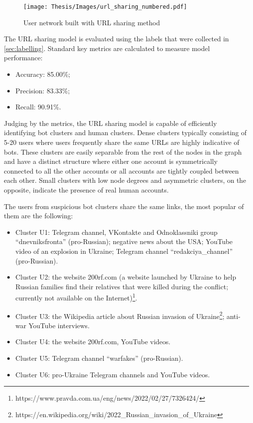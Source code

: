 \begin{figure}
	\centering
	\texttt{[image: Thesis/Images/url\_sharing\_numbered.pdf]}
	\caption{User network built with URL sharing  method}
	\label{fig:url-sharing}
\end{figure}

The URL sharing model is evaluated using the labels that were collected in \ref{sec:labelling}. Standard key metrics are calculated to measure model performance:
\begin{itemize}
    \item Accuracy: 85.00\%;
    \item Precision: 83.33\%;
    \item Recall: 90.91\%.
\end{itemize}

Judging by the metrics, the URL sharing model is capable of efficiently identifying bot clusters and human clusters. Dense clusters typically consisting of 5-20 users where users frequently share the same URLs are highly indicative of bots. These clusters are easily separable from the rest of the nodes in the graph and have a distinct structure where either one account is symmetrically connected to all the other accounts or all accounts are tightly coupled between each other. Small clusters with low node degrees and asymmetric clusters, on the opposite, indicate the presence of real human accounts. 

The users from suspicious bot clusters share the same links, the most popular of them are the following:

\begin{itemize}
    \item Cluster U1: Telegram channel, VKontakte and Odnoklassniki group ``dnevniksfronta'' (pro-Russian); negative news about the USA; YouTube video of an explosion in Ukraine; Telegram channel ``redakciya\_channel'' (pro-Russian). 
    \item Cluster U2: the website 200rf.com (a website launched by Ukraine to help Russian families find their relatives that were killed during the conflict; currently not available on the Internet)\footnote{https://www.pravda.com.ua/eng/news/2022/02/27/7326424/}.  
    \item Cluster U3: the Wikipedia article about Russian invasion of Ukraine\footnote{https://en.wikipedia.org/wiki/2022\_Russian\_invasion\_of\_Ukraine}; anti-war YouTube interviews.
    \item Cluster U4: the website 200rf.com, YouTube videos.
    \item Cluster U5: Telegram channel ``warfakes'' (pro-Russian).
    \item Cluster U6: pro-Ukraine Telegram channels and YouTube videos.
\end{itemize}

